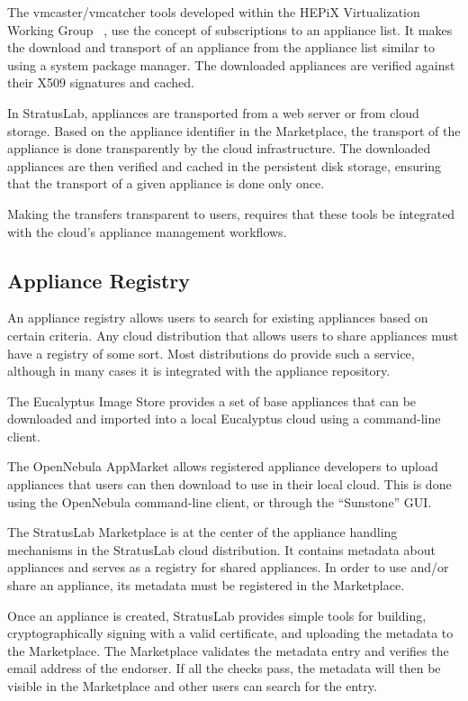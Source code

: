 The vmcaster/vmcatcher tools developed within the HEPiX Virtualization
Working Group ~\cite{hepixbooktransfer}, use the concept of
subscriptions to an appliance list. It makes the download and
transport of an appliance from the appliance list similar to using a
system package manager.  The downloaded appliances are verified
against their X509 signatures and cached.

In StratusLab, appliances are transported from a web server or from
cloud storage. Based on the appliance identifier in the Marketplace,
the transport of the appliance is done transparently by the cloud
infrastructure.  The downloaded appliances are then verified and
cached in the persistent disk storage, ensuring that the transport of
a given appliance is done only once.

Making the transfers transparent to users, requires that these tools
be integrated with the cloud's appliance management workflows.

\subsection{Appliance Registry}

An appliance registry allows users to search for existing appliances
based on certain criteria.  Any cloud distribution that allows users
to share appliances must have a registry of some sort. Most
distributions do provide such a service, although in many cases it is
integrated with the appliance repository.

The Eucalyptus Image Store provides a set of base appliances that can
be downloaded and imported into a local Eucalyptus cloud using a
command-line client.

The OpenNebula AppMarket allows registered appliance developers to
upload appliances that users can then download to use in their local
cloud. This is done using the OpenNebula command-line client, or
through the ``Sunstone'' GUI.

The StratusLab Marketplace is at the center of the appliance handling
mechanisms in the StratusLab cloud distribution. It contains metadata
about appliances and serves as a registry for shared appliances.  In
order to use and/or share an appliance, its metadata must be
registered in the Marketplace\@.

Once an appliance is created, StratusLab provides simple tools for
building, cryptographically signing with a valid certificate, and
uploading the metadata to the Marketplace\@.  The Marketplace
validates the metadata entry and verifies the email address of the
endorser.  If all the checks pass, the metadata will then be visible
in the Marketplace and other users can search for the entry.
